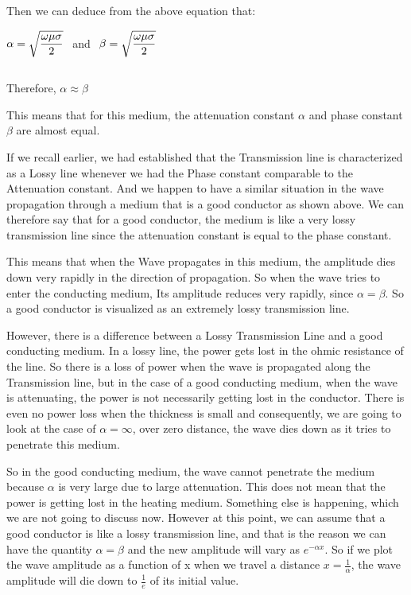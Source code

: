 Then we can deduce from the above equation that:

\begin{center}
$\alpha=\sqrt{\dfrac{\omega\mu\sigma}{2}}\hspace{0.15cm}$ and $\hspace{0.15cm}\beta=\sqrt{\dfrac{\omega\mu\sigma}{2}}$
\end{center}
\begin{equation}\end{equation}

Therefore,
$\alpha\approx\beta$

This means that for this medium, the attenuation constant $\alpha$ and phase constant $\beta$ are almost equal.

If we recall earlier, we had established that the Transmission line is characterized as a Lossy line whenever we had the Phase constant comparable to the Attenuation constant. And we happen to have a similar situation in the wave propagation through a medium that is a good conductor as shown above. We can therefore say that for a good conductor, the medium is like a very lossy transmission line since the attenuation constant is equal to the phase constant.

This means that when the Wave propagates in this medium, the amplitude dies down very rapidly in the direction of propagation. So when the wave tries to enter the conducting medium, Its amplitude reduces very rapidly, since $\alpha=\beta$. So a good conductor is visualized as an extremely lossy transmission line.

However, there is a difference between a Lossy Transmission Line and a good conducting medium. In a lossy line, the power gets lost in the ohmic resistance of the line. So there is a loss of power when the wave is propagated along the Transmission line, but in the case of a good conducting medium, when the wave is attenuating, the power is not necessarily getting lost in the conductor. There is even no power loss when the thickness is small and consequently, we are going to look at the case of $\alpha=\infty$, over zero distance, the wave dies down as it tries to penetrate this medium.

So in the good conducting medium, the wave cannot penetrate the medium because $\alpha$ is very large due to large attenuation. This does not mean that the power is getting lost in the heating medium. Something else is happening, which we are not going to discuss now. However at this point, we can assume that a good conductor is like a lossy transmission line, and that is the reason we can have the quantity $\alpha=\beta$ and the new amplitude will vary as $e^{-\alpha x}$. So if we plot the wave amplitude as a function of x when we travel a distance $x=\frac{1}{\alpha}$, the wave amplitude will die down to $\frac{1}{e}$ of its initial value.

